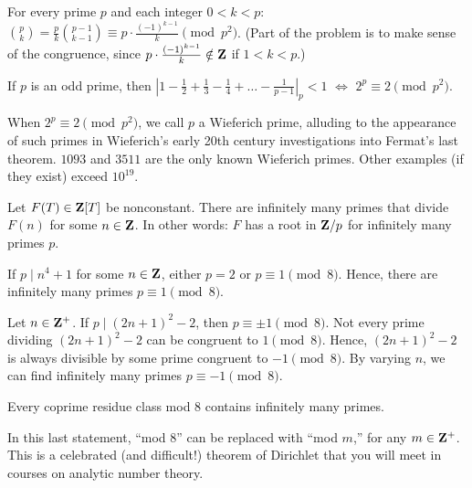 \begin{prob}\label{prob:22} For every prime $p$ and each integer $0 < k < p$:~$\binom{p}{k} = \frac{p}{k}\binom{p-1}{k-1}\equiv p \cdot \frac{(-1)^{k-1}}{k} \pmod{p^2}$. (Part of the problem is to make sense of the congruence, since $p \cdot \frac{(-1)^{k-1}}{k} \notin \mathbf{Z}$ if $1 < k < p$.)
\end{prob}

\begin{prob}[Eisenstein]\label{prob:23} If $p$ is an odd prime, then $|1-\frac{1}{2} + \frac{1}{3} - \frac{1}{4} + \dots - \frac{1}{p-1}|_{p} < 1$ $\Longleftrightarrow$ $2^p \equiv 2\pmod{p^2}$.


{\scriptsize When $2^p\equiv 2\pmod{p^2}$, we call $p$ a \textsf{Wieferich prime}, alluding to the appearance of such primes in Wieferich's early 20th century investigations into  Fermat's last theorem. $1093$ and $3511$ are the only known Wieferich primes. Other examples (if they exist) exceed $10^{19}$.}
\end{prob}
\label{set1}

\variations

\begin{prob}[Schur]\label{prob:24} Let $F(T) \in \mathbf{Z}[T]$ be nonconstant. There are infinitely many primes that divide $F(n)$ for some $n \in \mathbf{Z}$. In other words: $F$ has a root in $\mathbf{Z}/p$ for infinitely many primes $p$.
\end{prob}

\begin{prob}\label{prob:25} If $p \mid n^4+1$ for some $n \in \mathbf{Z}$, either $p=2$ or $p\equiv 1\pmod{8}$. Hence, there are infinitely many primes $p\equiv 1\pmod{8}$.
\end{prob}

\begin{prob}\label{prob:26} Let $n \in \mathbf{Z}^{+}$. If $p\mid (2n+1)^2-2$, then $p\equiv \pm 1 \pmod{8}$. Not every prime dividing $(2n+1)^2-2$ can be congruent to $1\pmod{8}$. Hence, $(2n+1)^2-2$ is always divisible by some prime congruent to $-1\pmod{8}$. By varying $n$, we can find  infinitely many primes $p\equiv -1\pmod{8}$.
\end{prob}

\begin{prob}\label{prob:27} Every coprime residue class mod $8$ contains infinitely many primes.

{\scriptsize In this last statement, ``mod $8$'' can be replaced with ``mod $m$,'' for any $m \in \mathbf{Z}^{+}$. This is a celebrated (and difficult!) theorem of Dirichlet that you will meet in courses on analytic number theory.}
\end{prob}



